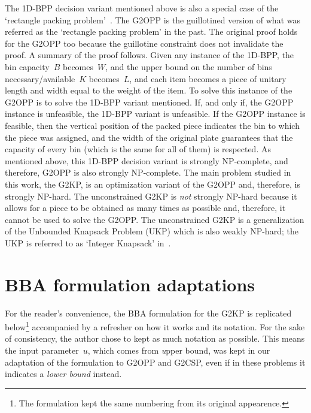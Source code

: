 The 1D-BPP decision variant mentioned above is also a special case of the `rectangle packing problem'~\citep{korf:initial:2003}.
The G2OPP is the guillotined version of what was referred as the `rectangle packing problem' in the past.
The original proof holds for the G2OPP too because the guillotine constraint does not invalidate the proof.
A summary of the proof follows.
Given any instance of the 1D-BPP, the bin capacity~\(B\) becomes~\(W\), and the upper bound on the number of bins necessary/available~\(K\) becomes~\(L\), and each item becomes a piece of unitary length and width equal to the weight of the item.
To solve this instance of the G2OPP is to solve the 1D-BPP variant mentioned.
If, and only if, the G2OPP instance is unfeasible, the 1D-BPP variant is unfeasible.
If the G2OPP instance is feasible, then the vertical position of the packed piece indicates the bin to which the piece was assigned, and the width of the original plate guarantees that the capacity of every bin (which is the same for all of them) is respected.
As mentioned above, this 1D-BPP decision variant is strongly NP-complete, and therefore, G2OPP is also strongly NP-complete.
The main problem studied in this work, the G2KP, is an optimization variant of the G2OPP and, therefore, is strongly NP-hard.
The unconstrained G2KP is \emph{not} strongly NP-hard because it allows for a piece to be obtained as many times as possible and, therefore, it cannot be used to solve the G2OPP.
The unconstrained G2KP is a generalization of the Unbounded Knapsack Problem (UKP) which is also weakly NP-hard; the UKP is referred to as `Integer Knapsack' in~\citet[MP10]{garey:1979}.

\section{BBA formulation adaptations}
\label{sec:formulation_adaptation}

For the reader's convenience, the BBA formulation for the G2KP is replicated below\footnote{The formulation kept the same numbering from its original appearence.} accompanied by a refresher on how it works and its notation.
For the sake of consistency, the author chose to kept as much notation as possible. This means the input parameter~\(u\), which comes from \emph{u}pper bound, was kept in our adaptation of the formulation to G2OPP and G2CSP, even if in these problems it indicates a \emph{lower bound} instead.

